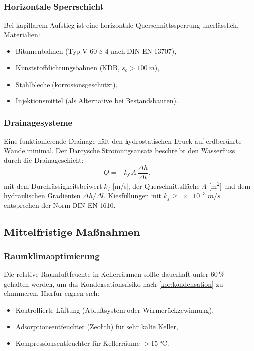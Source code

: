 ﻿\documentclass[a4paper,12pt]{article}
\theoremstyle{definition}
\begin{document}
\subsubsection{Horizontale Sperrschicht}

Bei kapillarem Aufstieg ist eine horizontale Querschnittssperrung
unerl\"asslich. Materialien:
\begin{itemize}
  \item Bitumenbahnen (Typ V 60 S 4 nach DIN EN 13707),
  \item Kunststoffdichtungsbahnen (KDB, $s_d > \SI{100}{m}$),
  \item Stahlbleche (korrosionsgesch\"utzt),
  \item Injektionsmittel (als Alternative bei Bestandsbauten).
\end{itemize}

\subsubsection{Drainagesysteme}

Eine funktionierende Drainage h\"alt den hydrostatischen Druck auf
erdber\"uhrte W\"ande minimal. Der Darcysche Str\"omungsansatz beschreibt
den Wasserfluss durch die Drainageschicht:
\begin{equation}
  Q = -k_f\,A\,\frac{\Delta h}{\Delta l},
  \label{eq:darcy}
\end{equation}
mit dem Durchl\"assigkeitsbeiwert $k_f$ [\si{m/s}], der Querschnittsfl\"ache
$A$ [\si{m^2}] und dem hydraulischen Gradienten $\Delta h / \Delta l$.
Kiesf\"ullungen mit $k_f \ge \SI{e-3}{m/s}$ entsprechen der
Norm DIN EN 1610.

\subsection{Mittelfristige Ma\ss{}nahmen}

\subsubsection{Raumklimaoptimierung}

Die relative Raumluftfeuchte in Kellerr\"aumen sollte dauerhaft unter
60\,\% gehalten werden, um das Kondensationsrisiko nach
\cref{kor:kondensation} zu eliminieren. Hierf\"ur eignen sich:
\begin{itemize}
  \item Kontrollierte L\"uftung (Abluftsystem oder W\"armer\"uckgewinnung),
  \item Adsorptionsentfeuchter (Zeolith) f\"ur sehr kalte Keller,
  \item Kompressionsentfeuchter f\"ur Kellerr\"aume $> \SI{15}{\celsius}$.
\end{itemize}
\end{document}
